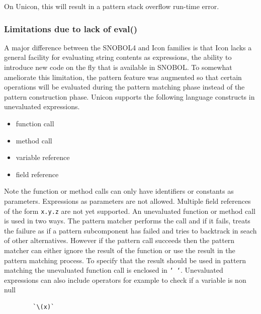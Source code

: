 \documentclass[letterpaper,12pt]{article}
\begin{document}
\noindent
On Unicon, this will result in a pattern stack overflow run-time error.


\subsubsection{Limitations due to lack of eval()}

A major difference between the SNOBOL4 and Icon families is that Icon
lacks a general facility for evaluating string contents as
expressions, the ability to introduce new code on the fly that is
available in SNOBOL. To somewhat ameliorate
this limitation, the pattern feature was augmented so that certain
operations will be evaluated during the pattern matching phase instead
of the pattern construction phase.  Unicon supports the following
language constructs in unevaluated expressions.

\begin{itemize}
\item function call
\item method call
\item variable reference
\item field reference
\end{itemize}

Note the function or method calls can only have identifiers or
constants as parameters. Expressions as parameters are not
allowed. Multiple field references of the form \texttt{x.y.z} are
not yet supported. An unevaluated function or method call is used in two
ways. The pattern matcher performs the call and if it fails, treats the
failure as if a pattern subcomponent has failed and tries to
backtrack in seach of other alternatives. However if the pattern call
succeeds then the pattern matcher can either ignore the result of the
function or use the result in the pattern matching process. To specify
that the result should be used in pattern matching the unevaluated
function call is enclosed in \texttt{` `}.  Unevaluated expressions
can also include operators for example to check if a variable is non
null

\begin{verbatim}
        `\(x)`
\end{verbatim}
\end{document}
